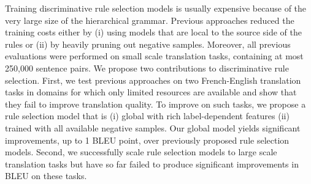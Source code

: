 Training discriminative rule selection models is usually expensive because of the very large size of the hierarchical grammar. Previous approaches reduced the training costs either by (i) using models that are local to the source side of the rules or (ii) by heavily pruning out negative samples. Moreover, all previous evaluations were performed on small scale translation tasks, containing at most 250,000 sentence pairs. We propose two contributions to discriminative rule selection. First, we test previous approaches on two French-English translation tasks in domains for which only limited resources are available and show that they fail to improve translation quality. To improve on such tasks, we propose a rule selection model that is (i) global with rich label-dependent features (ii) trained with all available negative samples. Our global model yields significant improvements, up to 1 BLEU point, over previously proposed rule selection models. Second, we successfully scale rule selection models to large scale translation tasks but have so far failed to produce significant improvements in BLEU on these tasks.
